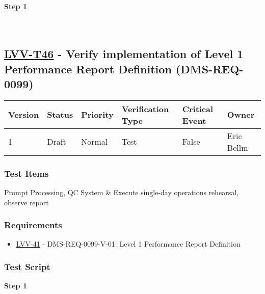 \textbf{Step 1}\\
~\\
~\\

\hypertarget{lvv-t46---verify-implementation-of-level-1-performance-report-definition-dms-req-0099}{%
\subsection{\texorpdfstring{\href{https://jira.lsstcorp.org/secure/Tests.jspa\#/testCase/LVV-T46}{LVV-T46}
- Verify implementation of Level 1 Performance Report Definition
(DMS-REQ-0099)}{LVV-T46 - Verify implementation of Level 1 Performance Report Definition (DMS-REQ-0099)}}\label{lvv-t46---verify-implementation-of-level-1-performance-report-definition-dms-req-0099}}

\begin{longtable}[]{@{}llllll@{}}
\toprule
Version & Status & Priority & Verification Type & Critical Event &
Owner\tabularnewline
\midrule
\endhead
1 & Draft & Normal & Test & False & Eric Bellm\tabularnewline
\bottomrule
\end{longtable}

\hypertarget{test-items-22}{%
\subsubsection{Test Items}\label{test-items-22}}

Prompt Processing, QC System \& Execute single-day operations rehearsal,
observe report

\hypertarget{requirements-23}{%
\subsubsection{Requirements}\label{requirements-23}}

\begin{itemize}
\tightlist
\item
  \href{https://jira.lsstcorp.org/browse/LVV-41}{LVV-41} -
  DMS-REQ-0099-V-01: Level 1 Performance Report Definition
\end{itemize}

\hypertarget{test-script-23}{%
\subsubsection{Test Script}\label{test-script-23}}

\textbf{Step 1}\\
~\\
~\\

